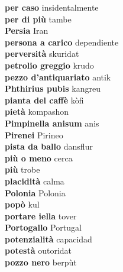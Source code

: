 \textbf{ per caso  } insidentalmente \\
\textbf{ per di più  } tambe \\
\textbf{ Persia  } Iran \\
\textbf{ persona a carico  } dependiente \\
\textbf{ perversità  } skuridat \\
\textbf{ petrolio greggio  } krudo \\
\textbf{ pezzo d’antiquariato  } antik \\
\textbf{ Phthirius pubis  } kangreu \\
\textbf{ pianta del caffè  } kòfi \\
\textbf{ pietà  } kompashon \\
\textbf{ Pimpinella anisum  } anis \\
\textbf{ Pirenei  } Pirineo \\
\textbf{ pista da ballo  } dansflur \\
\textbf{ più o meno  } cerca \\
\textbf{ più  } trobe \\
\textbf{ placidità  } calma \\
\textbf{ Polonia  } Polonia \\
\textbf{ popò  } kul \\
\textbf{ portare iella  } tover \\
\textbf{ Portogallo  } Portugal \\
\textbf{ potenzialità  } capacidad \\
\textbf{ potestà  } outoridat \\
\textbf{ pozzo nero  } berpùt \\
